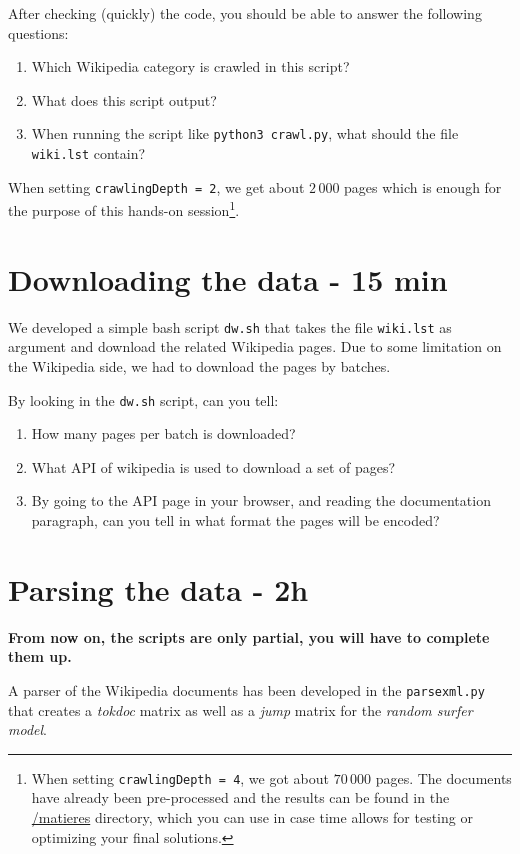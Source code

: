 \documentclass[mathserif, 11pt,c]{article}
\begin{document}
After checking (quickly) the code, you should be able to answer the following questions:
\begin{enumerate}[label=\textbf{Q\thesection.\arabic*}]
	\item Which Wikipedia category is crawled in this script?
	\item What does this script output?
	\item When running the script like \texttt{python3 crawl.py}, what should the file \texttt{wiki.lst} contain?
\end{enumerate}



When setting \texttt{crawlingDepth = 2}, we get about $2\,000$ pages which is enough for the purpose of this hands-on session\footnote{When setting \texttt{crawlingDepth = 4}, we got about $70\,000$ pages. The documents have already been pre-processed and the results can be found in the \url{/matieres} directory, which you can use in case time allows for testing or optimizing your final solutions.}.

\section{Downloading the data - 15 min}

We developed a simple bash script \texttt{dw.sh} that takes the file \texttt{wiki.lst} as argument and download the related Wikipedia pages. Due to some limitation on the Wikipedia side, we had to download the pages by batches.

By looking in the \texttt{dw.sh} script, can you tell:
\begin{enumerate}[label=\textbf{Q\thesection.\arabic*}]
	\item How many pages per batch is downloaded?
	\item What API of wikipedia is used to download a set of pages?
	\item By going to the API page in your browser, and reading the documentation paragraph, can you tell in what format the pages will be encoded?
\end{enumerate}


\section{Parsing the data - 2h}

\textbf{From now on, the scripts are only partial, you will have to complete them up.}


A parser of the Wikipedia documents has been developed in the \texttt{parsexml.py} that creates a \textit{tokdoc} matrix as well as a \textit{jump} matrix for the \textit{random surfer model}.
\end{document}
